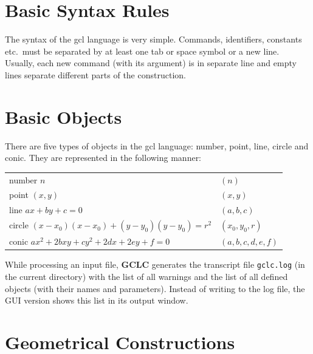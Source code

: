 \documentclass[a4paper]{book}
\newcommand{\gclc}{{\bfseries GCLC}\xspace}
\begin{document}
\section{Basic Syntax Rules}

The syntax of the {\sc gcl} language is very simple. Commands,
identifiers, constants etc.~must be separated by at least one
tab or space symbol or a new line. Usually, each new command
(with its argument) is in separate line and empty lines separate
different parts of the construction.


\section{Basic Objects}
\label{sec:basic_objects}

There are five types of objects in the {\sc gcl} language:
{\sc number}, {\sc point}, {\sc line}, {\sc circle} and {\sc conic}.
They are represented in the following manner:

\begin{tabular}{ll}
{\sc number} $n$                                 & $(n)$\\
{\sc point}  $(x,y)$                             & $(x,y)$\\
{\sc line}   $ax+by+c=0$                         & $(a,b,c)$\\
{\sc circle} $(x-x_0)(x-x_0)+(y-y_0)(y-y_0)=r^2$ & $(x_0,y_0,r)$ \\
{\sc conic} $ax^2+2bxy+cy^2+2dx+2ey+f=0$         & $(a,b,c,d,e,f)$  \\
\end{tabular}

While processing an input file, \gclc generates the transcript
file \verb|gclc.log| (in the current directory) with the list
of all warnings and the list of all defined objects (with
their names and parameters). Instead of writing to the log file,
the GUI version shows this list in its output window.


\section{Geometrical Constructions}
\end{document}
